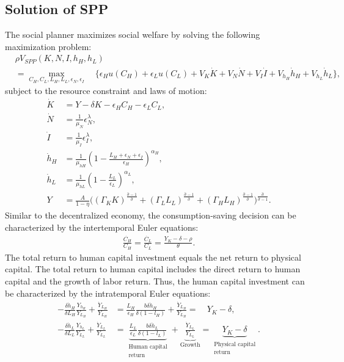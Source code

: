 \documentclass[12pt]{article}
\begin{document}
\subsection{Solution of SPP}
The social planner maximizes social welfare by solving the following maximization problem:
\begin{align*}
&\rho V_{SPP}(K,N,I,h_H,h_L)  \\
&= \max_{C_H, C_L,L_H,L_L,\epsilon_N, \epsilon_I} \quad \{\epsilon_H u(C_H)+\epsilon_L u(C_L)+V_K\dot{K}+V_N\dot{N}+V_I\dot{I}+V_{h_H}\dot{h}_H+V_{h_L}\dot{h}_L\},
\end{align*}
subject to the resource constraint and laws of motion: 
\begin{align*}
\dot{K} &= Y-\delta K-\epsilon_H C_H-\epsilon_L C_L, \\
\dot{N} &= \frac{1}{\mu_N}\epsilon_N^{\lambda}, \\
\dot{I} &= \frac{1}{\mu_I}\epsilon_I^{\lambda}, \\
\dot{h}_H &= \frac{1}{\mu_{hH}} (1-\frac{L_H+\epsilon_N+\epsilon_I}{\epsilon_H})^{\alpha_H}, \\
\dot{h}_L &= \frac{1}{\mu_{hL}} (1-\frac{L_L}{\epsilon_L})^{\alpha_L}, \\
Y &= \frac{A}{1-\eta}\Big((\Gamma_KK)^{\frac{\hat{\sigma}-1}{\hat{\sigma}}}+(\Gamma_LL_L)^{\frac{\hat{\sigma}-1}{\hat{\sigma}}}+(\Gamma_HL_H)^{\frac{\hat{\sigma}-1}{\hat{\sigma}}}\Big)^{\frac{\hat{\sigma}}{\hat{\sigma}-1}}.
\end{align*}
Similar to the decentralized economy, the consumption-saving decision can be characterized by the intertemporal Euler equations:
\begin{align*}
\frac{\dot{C_H}}{C_H} = \frac{\dot{C_L}}{C_L} = \frac{Y_K-\delta-\rho}{\theta}.
\end{align*}
The total return to human capital investment equals the net return to physical capital. The total return to human capital includes the direct return to human capital and the growth of labor return. Thus, the human capital investment can be characterized by the intratemporal Euler equations: 
\begin{align*}
-\frac{\delta \dot{h}_H}{\delta L_H}\frac{Y_{h_H}}{Y_{L_H}}+\frac{\dot{Y}_{L_H}}{Y_{L_H}} &=\frac{L_H}{\epsilon_H}\frac{b \delta \dot{h}_H}{\delta(1-l_H)}+\frac{\dot{Y}_{L_H}}{Y_{L_H}} = \quad Y_K-\delta, \\
-\frac{\delta \dot{h}_L}{\delta L_L}\frac{Y_{h_L}}{Y_{L_L}}+\frac{\dot{Y}_{L_L}}{Y_{L_L}} &= \underbrace{\frac{L_L}{\epsilon_L}\frac{b \delta \dot{h}_L}{\delta(1-l_L)}}_{\substack{\text{Human capital}\\ \text{return}}}+\underbrace{\frac{\dot{Y}_{L_L}}{Y_{L_L}}}_{\text{Growth}} = \underbrace{Y_K-\delta}_{\substack{\text{Physical capital}\\ \text{return}}}. 
\end{align*}
\end{document}
